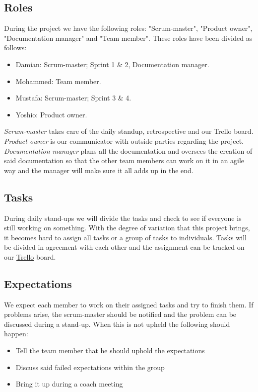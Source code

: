 \documentclass[12pt]{article}
\begin{document}
	\subsection{Roles}
	During the project we have the following roles: "Scrum-master", "Product owner", "Documentation manager" and "Team member". These roles have been divided as follows:
	\begin{itemize}
		\item Damian: Scrum-master; Sprint 1 \& 2, Documentation manager.
		\item Mohammed: Team member.
		\item Mustafa: Scrum-master; Sprint 3 \& 4.
		\item Yoshio: Product owner.
	\end{itemize}
	\emph{Scrum-master} takes care of the daily standup, retrospective and our Trello board.\\
	\emph{Product owner} is our communicator with outside parties regarding the project.\\
	\emph{Documentation manager} plans all the documentation and oversees the creation of said documentation so that the other team members can work on it in an agile way and the manager will make sure it all adds up in the end.
	\subsection{Tasks}
	During daily stand-ups we will divide the tasks and check to see if everyone is still working on something. With the degree of variation that this project brings, it becomes hard to assign all tasks or a group of tasks to individuals. Tasks will be divided in agreement with each other and the assignment can be tracked on our \href{https://trello.com/b/VLCdhQAQ/sprint-3}{Trello} board.
	\subsection{Expectations}
	We expect each member to work on their assigned tasks and try to finish them. If problems arise, the scrum-master should be notified and the problem can be discussed during a stand-up. When this is not upheld the following should happen:
	\begin{itemize}
		\item Tell the team member that he should uphold the expectations
		\item Discuss said failed expectations within the group
		\item Bring it up during a coach meeting
	\end{itemize}
\end{document}
